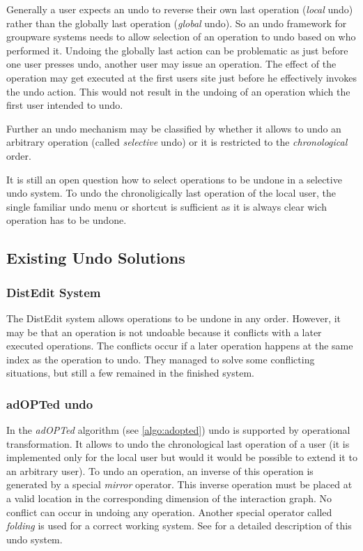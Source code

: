 Generally a user expects an undo to reverse their own last operation (\emph{local} undo) rather than the globally last operation (\emph{global} undo). So an undo framework for groupware systems needs to allow selection of an operation to undo based on who performed it. Undoing the globally last action can be problematic as just before one user presses undo, another user may issue an operation. The effect of the operation may get executed at the first users site just before he effectively invokes the undo action. This would not result in the undoing of an operation which the first user intended to undo.

Further an undo mechanism may be classified by whether it allows to undo an arbitrary operation (called \emph{selective} undo) or it is restricted to the \emph{chronological} order.

It is still an open question how to select operations to be undone in a selective undo system. To undo the chronoligically last operation of the local user, the single familiar undo menu or shortcut is sufficient as it is always clear wich operation has to be undone.


\subsection{Existing Undo Solutions}

\subsubsection{DistEdit System}
The DistEdit system \cite{prakash94} allows operations to be undone in any order. However, it may be that an operation is not undoable because it conflicts with a later executed operations. The conflicts occur if a later operation happens at the same index as the operation to undo. They managed to solve some conflicting situations, but still a few remained in the finished system.


\subsubsection{adOPTed undo}
In the \emph{adOPTed} algorithm (see \ref{algo:adopted}) undo is supported by operational transformation. It allows to undo the chronological last operation of a user (it is implemented only for the local user but would it would be possible to extend it to an arbitrary user). To undo an operation, an inverse of this operation is generated by a special \emph{mirror} operator. This inverse operation must be placed at a valid location in the corresponding dimension of the interaction graph. No conflict can occur in undoing any operation. Another special operator called \emph{folding} is used for a correct working system. See \cite{ressel99} for a detailed description of this undo system.

